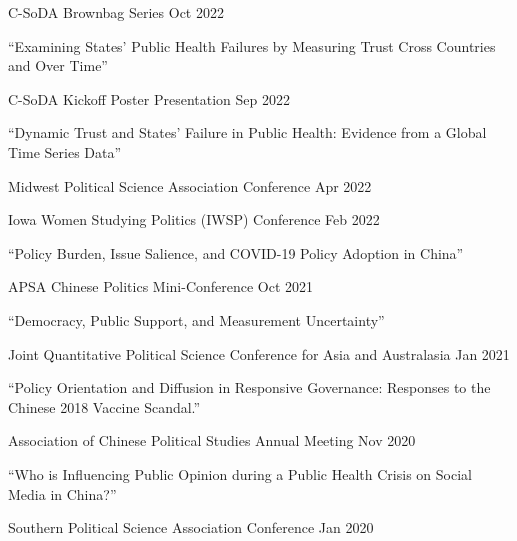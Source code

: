 \documentclass[10.5pt,]{article}
\providecommand{\tightlist}{%
	\setlength{\itemsep}{0pt}\setlength{\parskip}{0pt}}
\renewenvironment{itemize}{
	\begin{list}{}{
			\setlength{\leftmargin}{1.5em}
		}
	}{
	\end{list}
}
\begin{document}
\begin{itemize}
  \begin{itemize}
  \tightlist
  \item
    C-SoDA Brownbag Series \hfill Oct 2022
  \end{itemize}
\item
  ``Examining States' Public Health Failures by Measuring Trust Cross
  Countries and Over Time''

  \begin{itemize}
  \tightlist
  \item
    C-SoDA Kickoff Poster Presentation \hfill Sep 2022
  \end{itemize}
\item
  ``Dynamic Trust and States' Failure in Public Health: Evidence from a
  Global Time Series Data''

  \begin{itemize}
  \tightlist
  \item
    Midwest Political Science Association Conference \hfill Apr 2022
  \item
    Iowa Women Studying Politics (IWSP) Conference \hfill Feb 2022
  \end{itemize}
\item
  ``Policy Burden, Issue Salience, and COVID-19 Policy Adoption in
  China''

  \begin{itemize}
  \tightlist
  \item
    APSA Chinese Politics Mini-Conference \hfill Oct 2021
  \end{itemize}
\item
  ``Democracy, Public Support, and Measurement Uncertainty''

  \begin{itemize}
  \tightlist
  \item
    Joint Quantitative Political Science Conference for Asia and
    Australasia \hfill Jan 2021
  \end{itemize}
\item
  ``Policy Orientation and Diffusion in Responsive Governance: Responses
  to the Chinese 2018 Vaccine Scandal.''

  \begin{itemize}
  \tightlist
  \item
    Association of Chinese Political Studies Annual Meeting \hfill Nov
    2020
  \end{itemize}
\item
  ``Who is Influencing Public Opinion during a Public Health Crisis on
  Social Media in China?''

  \begin{itemize}
  \tightlist
  \item
    Southern Political Science Association Conference \hfill  Jan 2020
  \end{itemize}
\end{itemize}
\end{document}
